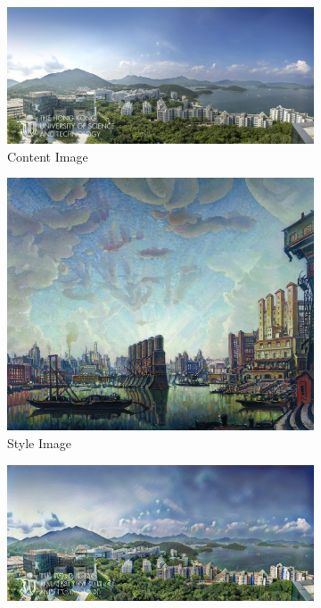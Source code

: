 \documentclass{article}
\begin{document}
\begin{figure}[h!]
    \centering
    \begin{minipage}{\textwidth}
        \centering
        \begin{subfigure}{0.25\textwidth}
            \includegraphics[width=\textwidth]{./data_set/HKUST/1.jpg}
            \caption{Content Image}
        \end{subfigure}
        \hfill %
        \begin{subfigure}{0.25\textwidth}
            \includegraphics[width=\textwidth]{./wikiart/Symbolism/konstantin-bogaevsky_port-of-imaginary-city-1932.jpg}
            \caption{Style Image}
        \end{subfigure}
        \hfill %
        \begin{subfigure}{0.25\textwidth}
            \includegraphics[width=\textwidth]{./part1_inference/output_1_konstantin-bogaevsky_port-of-imaginary-city-1932.jpg}

\end{subfigure}
\end{minipage}
\end{figure}
\end{document}

